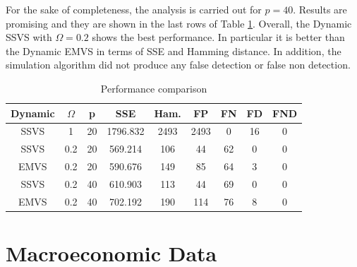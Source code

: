 \documentclass[
  12pt,
]{book}
\theoremstyle{break}
\theoremstyle{nonumberplain}
\begin{document}
For the sake of completeness, the analysis is carried out for \(p=40\).
Results are promising and they are shown in the last rows of Table
\ref{tab:mytab3}. Overall, the Dynamic SSVS with \(\Omega=0.2\) shows
the best performance. In particular it is better than the Dynamic EMVS
in terms of SSE and Hamming distance. In addition, the simulation
algorithm did not produce any false detection or false non detection.

\begin{table}[H]

\caption{\label{tab:mytab3}Performance comparison}
\centering
\begin{tabular}[t]{ccccccccc}
\toprule
Dynamic & $\Omega$ & p & SSE & Ham. & FP & FN & FD & FND\\
\midrule
SSVS & 1 & 20 & 1796.832 & 2493 & 2493 & 0 & 16 & 0\\
SSVS & 0.2 & 20 & 569.214 & 106 & 44 & 62 & 0 & 0\\
EMVS & 0.2 & 20 & 590.676 & 149 & 85 & 64 & 3 & 0\\
SSVS & 0.2 & 40 & 610.903 & 113 & 44 & 69 & 0 & 0\\
EMVS & 0.2 & 40 & 702.192 & 190 & 114 & 76 & 8 & 0\\
\bottomrule
\end{tabular}
\end{table}

\section{Macroeconomic Data}\label{Macro2}
\end{document}
